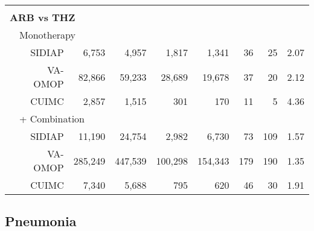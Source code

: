 \documentclass[11pt,]{article}
\begin{document}
\begin{longtable}{p{-2em}p{-2em}rrrrrrrr}
   \rowcolor{white} \\ \multicolumn{9}{l}{\textbf{ARB vs THZ}} \\ & \multicolumn{9}{l}{Monotherapy}  \\ &  & SIDIAP & 6,753 & 4,957 & 1,817 & 1,341 & 36 & 25 & 2.07 \\ 
   &  & VA-OMOP & 82,866 & 59,233 & 28,689 & 19,678 & 37 & 20 & 2.12 \\ 
   &  & CUIMC & 2,857 & 1,515 & 301 & 170 & 11 & 5 & 4.36 \\ 
                           & \multicolumn{8}{l}{+ Combination} \\ &  & SIDIAP & 11,190 & 24,754 & 2,982 & 6,730 & 73 & 109 & 1.57 \\ 
   &  & VA-OMOP & 285,249 & 447,539 & 100,298 & 154,343 & 179 & 190 & 1.35 \\ 
   &  & CUIMC & 7,340 & 5,688 & 795 & 620 & 46 & 30 & 1.91 \\ 
  
  \bottomrule
\end{longtable}

\clearpage

\hypertarget{pneumonia}{%
\subsection{Pneumonia}\label{pneumonia}}
\end{document}

